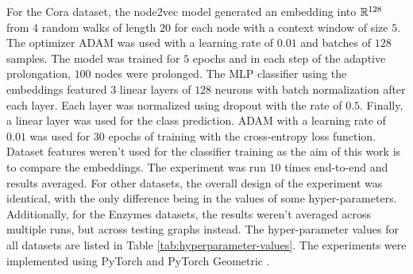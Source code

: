 For the Cora dataset, the node2vec model generated an embedding into \( \mathbb{R}^{128} \) from \( 4 \) random walks of length \( 20 \) for each node with a context window of size \( 5 \). The optimizer ADAM \cite{kingma_adam:_2017} was used with a learning rate of \( 0.01 \) and batches of \( 128 \) samples. The model was trained for \( 5 \) epochs and in each step of the adaptive prolongation, \( 100 \) nodes were prolonged. The MLP classifier using the embeddings featured \( 3 \) linear layers of \( 128 \) neurons with batch normalization after each layer. Each layer was normalized using dropout \cite{srivastava_dropout_2014} with the rate of \( 0.5 \). Finally, a linear layer was used for the class prediction. ADAM with a learning rate of \( 0.01 \)  was used for \( 30 \) epochs of training with the cross-entropy loss function. Dataset features weren't used for the classifier training as the aim of this work is to compare the embeddings. The experiment was run \( 10 \) times end-to-end and results averaged. For other datasets, the overall design of the experiment was identical, with the only difference being in the values of some hyper-parameters. Additionally, for the Enzymes datasets, the results weren't averaged across multiple runs, but across testing graphs instead. The hyper-parameter values for all datasets are listed in Table \ref{tab:hyperparameter-values}. The experiments were implemented using PyTorch \cite{paszke_pytorch_2019} and PyTorch Geometric \cite{fey_fast_2019}.

